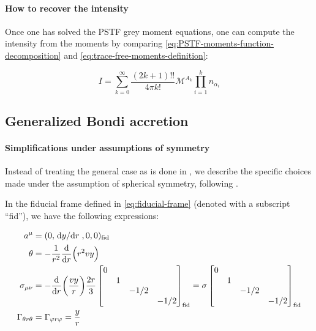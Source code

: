 \documentclass[main.tex]{subfiles}
\begin{document}
\paragraph{How to recover the intensity}

Once one has solved the PSTF grey moment equations, one can compute the intensity from the moments by comparing \eqref{eq:PSTF-moments-function-decomposition} and \eqref{eq:trace-free-moments-definition}:

\begin{equation}
  I = \sum _{k=0}   ^{\infty} \frac{(2k+1)!!}{4 \pi k!} \mathscr M^{A_k} \prod_{i=1}^k n_{\alpha_i}
\end{equation}

\subsection{Generalized Bondi accretion}

\paragraph{Simplifications under assumptions of symmetry}

Instead of treating the general case as is done in \cite[]{Thorne:1981feb}, we describe the specific choices made under the assumption of spherical symmetry, following \cite[]{ThorneFLammmangZytkow:1981feb}.

In the fiducial frame defined in \eqref{eq:fiducial-frame}  (denoted with a subscript ``fid''), we have the following expressions:

\begin{subequations} \label{eq:spherical-coordinates-simplifications}
\begin{align}
  a^\mu &= (0,\dv*{y}{r},0,0)_{\text{fid}} \\
  \theta &= - \frac{1}{r^2} \dv{}{r} \qty(r^2 v y)  \\
  \sigma_{\mu\nu} &= - \dv{}{r} \qty(\frac{vy}{r}) \frac{2r}{3} \begin{bmatrix}
  0   &   &   &  \\
     &  1 &   &  \\
     &   & -1/2  &  \\
     &   &   & -1/2
  \end{bmatrix} _{\text{fid}}
  = \sigma \begin{bmatrix}
  0   &   &   &  \\
     &  1 &   &  \\
     &   & -1/2  &  \\
     &   &   & -1/2
  \end{bmatrix} _{\text{fid}} \\
  \Gamma_{\theta r \theta} &= \Gamma_{\varphi r \varphi} = \frac{y}{r}
\end{align}
\end{subequations}
\end{document}
